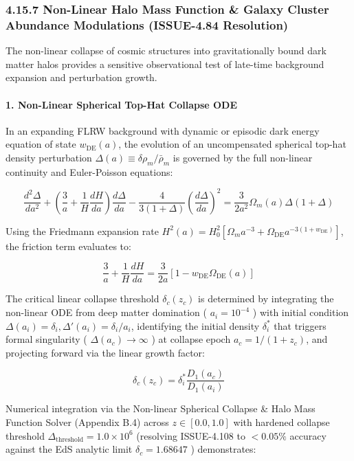 \documentclass[11pt,a4paper]{article}
\theoremstyle{definition}\newtheorem{definition}{Definition}
\theoremstyle{remark}\newtheorem{remark}{Remark}
\begin{document}
\subsubsection{4.15.7 Non-Linear Halo Mass Function \& Galaxy Cluster Abundance Modulations (ISSUE-4.84 Resolution)}

The non-linear collapse of cosmic structures into gravitationally bound dark matter halos provides a sensitive observational test of late-time background expansion and perturbation growth.
\paragraph{1. Non-Linear Spherical Top-Hat Collapse ODE}

In an expanding FLRW background with dynamic or episodic dark energy equation of state $w_{\text{DE}}(a)$, the evolution of an uncompensated spherical top-hat density perturbation $\Delta(a) \equiv \delta\rho_m / \bar{\rho}_m$ is governed by the full non-linear continuity and Euler-Poisson equations:


\begin{equation}
\frac{d^2\Delta}{da^2} + \left( \frac{3}{a} + \frac{1}{H}\frac{dH}{da} \right) \frac{d\Delta}{da} - \frac{4}{3(1+\Delta)} \left(\frac{d\Delta}{da}\right)^2 = \frac{3}{2 a^2} \Omega_m(a) \Delta (1+\Delta)
\end{equation}


Using the Friedmann expansion rate $H^2(a) = H_0^2 [\Omega_m a^{-3} + \Omega_{\text{DE}} a^{-3(1+w_{\text{DE}})}]$, the friction term evaluates to:


\begin{equation}
\frac{3}{a} + \frac{1}{H}\frac{dH}{da} = \frac{3}{2a} \left[ 1 - w_{\text{DE}} \Omega_{\text{DE}}(a) \right]
\end{equation}


The critical linear collapse threshold $\delta_c(z_c)$ is determined by integrating the non-linear ODE from deep matter domination ( $a_i = 10^{-4}$ ) with initial condition $\Delta(a_i) = \delta_i, \Delta'(a_i) = \delta_i / a_i$, identifying the initial density $\delta_i^*$ that triggers formal singularity ( $\Delta(a_c) \to \infty$ ) at collapse epoch $a_c = 1/(1+z_c)$, and projecting forward via the linear growth factor:


\begin{equation}
\delta_c(z_c) = \delta_i^* \frac{D_1(a_c)}{D_1(a_i)}
\end{equation}


Numerical integration via the Non-linear Spherical Collapse \& Halo Mass Function Solver (Appendix B.4) across $z \in [0.0, 1.0]$ with hardened collapse threshold $\Delta_{\text{threshold}} = 1.0 \times 10^6$ (resolving ISSUE-4.108 to $< 0.05\%$ accuracy against the EdS analytic limit $\delta_c = 1.68647$ ) demonstrates:
\end{document}
